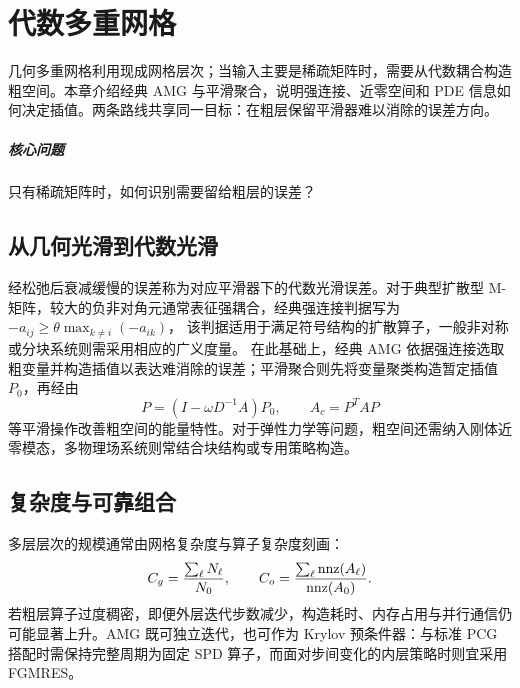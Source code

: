 \chapter{代数多重网格}\label{v0ch:20}
\begin{chaptersummary}
几何多重网格利用现成网格层次；当输入主要是稀疏矩阵时，需要从代数耦合构造粗空间。本章介绍经典 AMG 与平滑聚合，说明强连接、近零空间和 PDE 信息如何决定插值。两条路线共享同一目标：在粗层保留平滑器难以消除的误差方向。
\end{chaptersummary}
\paragraph{核心问题}只有稀疏矩阵时，如何识别需要留给粗层的误差？

\section{从几何光滑到代数光滑}
经松弛后衰减缓慢的误差称为对应平滑器下的代数光滑误差。对于典型扩散型 M-矩阵，较大的负非对角元通常表征强耦合，经典强连接判据写为
$-a_{ij}\ge\theta\max_{k\ne i}(-a_{ik})$，
该判据适用于满足符号结构的扩散算子，一般非对称或分块系统则需采用相应的广义度量。
在此基础上，经典 AMG 依据强连接选取粗变量并构造插值以表达难消除的误差；平滑聚合则先将变量聚类构造暂定插值 $P_0$，再经由
\[
 P=(I-\omega D^{-1}A)P_0,\qquad A_c=P^TAP
\]
等平滑操作改善粗空间的能量特性。对于弹性力学等问题，粗空间还需纳入刚体近零模态，多物理场系统则常结合块结构或专用策略构造。
\section{复杂度与可靠组合}
多层层次的规模通常由网格复杂度与算子复杂度刻画：
\[
 C_g=\frac{\sum_\ell N_\ell}{N_0},\qquad
 C_o=\frac{\sum_\ell\operatorname{nnz}(A_\ell)}{\operatorname{nnz}(A_0)}.
\]
若粗层算子过度稠密，即便外层迭代步数减少，构造耗时、内存占用与并行通信仍可能显著上升。AMG 既可独立迭代，也可作为 Krylov 预条件器：与标准 PCG 搭配时需保持完整周期为固定 SPD 算子，而面对步间变化的内层策略时则宜采用 FGMRES。
